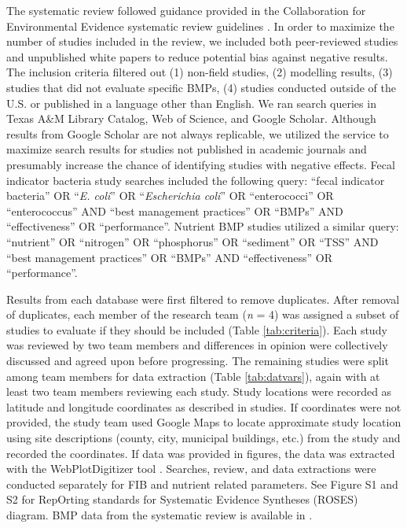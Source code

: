 \documentclass[utf8]{FrontiersinHarvard}
\begin{document}
The systematic review followed guidance provided in the Collaboration for Environmental Evidence systematic review guidelines \citep{collaborationforenvironmentalevidenceGuidelinesStandardsEvidence2018}.
In order to maximize the number of studies included in the review, we included both peer-reviewed studies and unpublished white papers to reduce potential bias against negative results.
The inclusion criteria filtered out (1) non-field studies, (2) modelling results, (3) studies that did not evaluate specific BMPs, (4) studies conducted outside of the U.S. or published in a language other than English.
We ran search queries in Texas A\&M Library Catalog, Web of Science, and Google Scholar.
Although results from Google Scholar are not always replicable, we utilized the service to maximize search results for studies not published in academic journals and presumably increase the chance of identifying studies with negative effects.
Fecal indicator bacteria study searches included the following query: ``fecal indicator bacteria'' OR ``\emph{E. coli}'' OR ``\emph{Escherichia coli}'' OR ``enterococci'' OR ``enterococcus'' AND ``best management practices'' OR ``BMPs'' AND ``effectiveness'' OR ``performance''. Nutrient BMP studies utilized a similar query: ``nutrient'' OR ``nitrogen'' OR ``phosphorus'' OR ``sediment'' OR ``TSS'' AND ``best management practices'' OR ``BMPs'' AND ``effectiveness'' OR ``performance''.

Results from each database were first filtered to remove duplicates.
After removal of duplicates, each member of the research team (\emph{n} = 4) was assigned a subset of studies to evaluate if they should be included (Table \ref{tab:criteria}).
Each study was reviewed by two team members and differences in opinion were collectively discussed and agreed upon before progressing.
The remaining studies were split among team members for data extraction (Table \ref{tab:datvars}), again with at least two team members reviewing each study.
Study locations were recorded as latitude and longitude coordinates as described in studies.
If coordinates were not provided, the study team used Google Maps to locate approximate study location using site descriptions (county, city, municipal buildings, etc.) from the study and recorded the coordinates.
If data was provided in figures, the data was extracted with the WebPlotDigitizer tool \citep{rohatgiWebPlotDigitizer2022}.
Searches, review, and data extractions were conducted separately for FIB and nutrient related parameters.
See Figure S1 and S2 for RepOrting standards for Systematic Evidence Syntheses
(ROSES) diagram.
BMP data from the systematic review is available in \citet{kikoyoTWRINPSBMPDB2024}.
\end{document}

